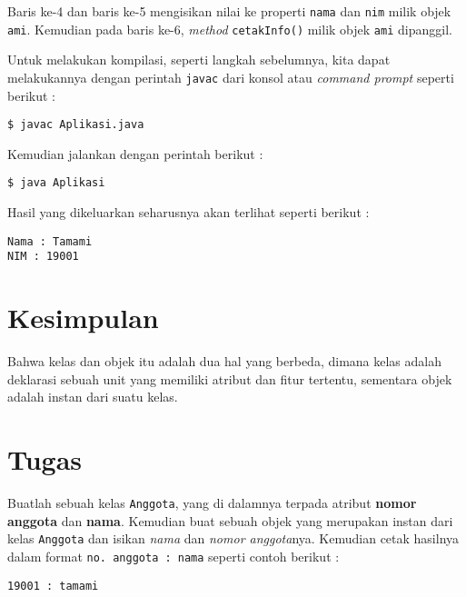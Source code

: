 Baris ke-4 dan baris ke-5 mengisikan nilai ke properti \texttt{nama} dan \texttt{nim} milik objek \texttt{ami}. Kemudian pada baris ke-6, \textit{method} \texttt{cetakInfo()} milik objek \texttt{ami} dipanggil.

Untuk melakukan kompilasi, seperti langkah sebelumnya, kita dapat melakukannya dengan perintah \texttt{javac} dari konsol atau \textit{command prompt} seperti berikut :

\begin{lstlisting}
$ javac Aplikasi.java
\end{lstlisting}

Kemudian jalankan dengan perintah berikut :

\begin{lstlisting}
$ java Aplikasi
\end{lstlisting}

Hasil yang dikeluarkan seharusnya akan terlihat seperti berikut :

\begin{lstlisting}
Nama : Tamami
NIM : 19001
\end{lstlisting}

\section{Kesimpulan}

Bahwa kelas dan objek itu adalah dua hal yang berbeda, dimana kelas adalah deklarasi sebuah unit yang memiliki atribut dan fitur tertentu, sementara objek adalah instan dari suatu kelas.

\section{Tugas}

Buatlah sebuah kelas \texttt{Anggota}, yang di dalamnya terpada atribut \textbf{nomor anggota} dan \textbf{nama}. Kemudian buat sebuah objek yang merupakan instan dari kelas \texttt{Anggota} dan isikan \textit{nama} dan \textit{nomor anggota}nya. Kemudian cetak hasilnya dalam format \texttt{no. anggota : nama} seperti contoh berikut :

\begin{lstlisting}
19001 : tamami
\end{lstlisting}